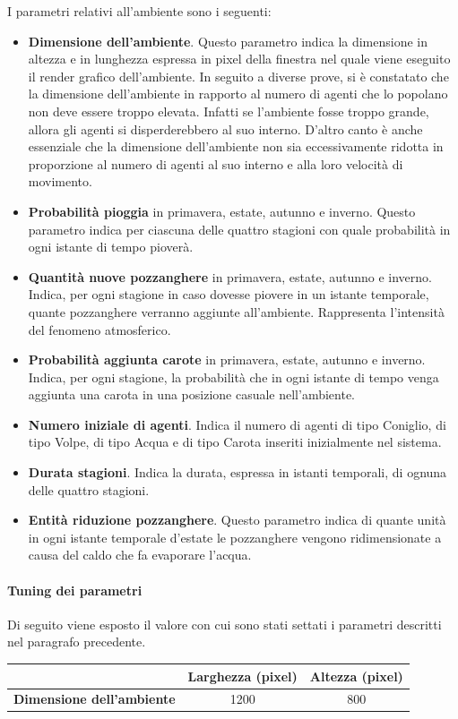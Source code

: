 \documentclass[11pt]{article}
\begin{document}
I parametri relativi all'ambiente sono i seguenti: 
\begin{itemize}
    \item \textbf{Dimensione dell'ambiente}. Questo parametro indica la dimensione in altezza e in lunghezza espressa in pixel della finestra nel quale viene eseguito il render grafico dell'ambiente. In seguito a diverse prove, si è constatato che la dimensione dell'ambiente in rapporto al numero di agenti che lo popolano non deve essere troppo elevata. Infatti se l'ambiente fosse troppo grande, allora gli agenti si disperderebbero al suo interno. D'altro canto è anche essenziale che la dimensione dell'ambiente non sia eccessivamente ridotta in proporzione al numero di agenti al suo interno e alla loro velocità di movimento. 
    \item \textbf{Probabilità pioggia} in primavera, estate, autunno e inverno. Questo parametro indica per ciascuna delle quattro stagioni con quale probabilità in ogni istante di tempo pioverà.
    \item \textbf{Quantità nuove pozzanghere} in primavera, estate, autunno e inverno. Indica, per ogni stagione in caso dovesse piovere in un istante temporale, quante pozzanghere verranno aggiunte all'ambiente. Rappresenta l'intensità del fenomeno atmosferico.
    \item \textbf{Probabilità aggiunta carote} in primavera, estate, autunno e inverno. Indica, per ogni stagione, la probabilità che in ogni istante di tempo venga aggiunta una carota in una posizione casuale nell'ambiente.
    \item \textbf{Numero iniziale di agenti}. Indica il numero di agenti di tipo Coniglio, di tipo Volpe, di tipo Acqua e di tipo Carota inseriti inizialmente nel sistema. 
    \item \textbf{Durata stagioni}. Indica la durata, espressa in istanti temporali, di ognuna delle quattro stagioni. 
    \item \textbf{Entità riduzione pozzanghere}. Questo parametro indica di quante unità in ogni istante temporale d'estate le pozzanghere vengono ridimensionate a causa del caldo che fa evaporare l'acqua. 
\end{itemize}
\vspace{2pt}
\paragraph{Tuning dei parametri}
\label{sec:tuningAmbiente}
Di seguito viene esposto il valore con cui sono stati settati i parametri descritti nel paragrafo precedente.
\vspace{13pt}
\begin{table}[h!]
\centering
{\renewcommand\arraystretch{1.6}
\begin{tabular}{l|cc}
 & \textbf{Larghezza (pixel)} & \textbf{Altezza (pixel)} \\ \hline
\textbf{Dimensione dell'ambiente} & 1200      & 800      
\end{tabular}}
\end{table}
\end{document}

